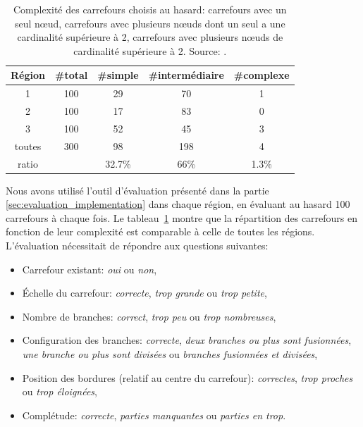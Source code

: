 \begin{table}[ht]
    \centering
    \footnotesize
    \begin{tabular}{c|c|c|c|c}
    Région & \#total & \#simple &\#intermédiaire& \#complexe \\
    \hline
     1 & 100 & 29 & 70 & 1 \\
     2 & 100 & 17 & 83 & 0 \\
     3 & 100 & 52 & 45 & 3 \\
     \hline
     toutes & 300 & 98 & 198 & 4 \\
     \hline
     ratio & &  32.7\% & 66\% & 1.3\%\\
    \end{tabular}
    \caption[Complexité des carrefours choisis au hasard]{Complexité des carrefours choisis au hasard: carrefours avec un seul nœud, carrefours avec plusieurs nœuds dont un seul a une cardinalité supérieure à 2, carrefours avec plusieurs nœuds de cardinalité supérieure à 2. Source: \citep{Favreau2022}.}
    \label{tab:selectedRegions}
\end{table}

Nous avons utilisé l'outil d'évaluation présenté dans la partie \ref{sec:evaluation_implementation}
dans chaque région, en évaluant au hasard 100 carrefours à chaque fois. Le tableau~\ref{tab:selectedRegions} montre que la répartition des carrefours en fonction de leur complexité est comparable à celle de toutes les régions. L'évaluation nécessitait de répondre aux questions suivantes:
\begin{itemize}
    \item Carrefour existant: \textit{oui} ou \textit{non},
    \item Échelle du carrefour: \textit{correcte}, \textit{trop grande} ou \textit{trop petite},
    \item Nombre de branches: \textit{correct}, \textit{trop peu} ou \textit{trop nombreuses},
    \item Configuration des branches: \textit{correcte}, \textit{deux branches ou plus sont fusionnées}, \textit{une branche ou plus sont divisées} ou \textit{branches fusionnées et divisées},
    \item Position des bordures (relatif au centre du carrefour): \textit{correctes}, \textit{trop proches} ou \textit{trop éloignées},
    \item Complétude: \textit{correcte}, \textit{parties manquantes} ou \textit{parties en trop}.
\end{itemize}


